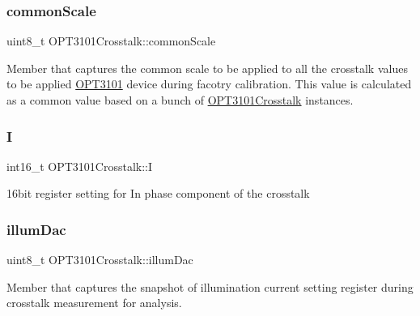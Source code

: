 \subsubsection{\texorpdfstring{common\+Scale}{commonScale}}
{\footnotesize\ttfamily uint8\+\_\+t O\+P\+T3101\+Crosstalk\+::common\+Scale}



Member that captures the common scale to be applied to all the crosstalk values to be applied \mbox{\hyperlink{namespace_o_p_t3101}{O\+P\+T3101}} device during facotry calibration. This value is calculated as a common value based on a bunch of \mbox{\hyperlink{class_o_p_t3101_crosstalk}{O\+P\+T3101\+Crosstalk}} instances. 

\mbox{\label{class_o_p_t3101_crosstalk_a382c8271e35b33821b22d612466c96c7}} 
\subsubsection{\texorpdfstring{I}{I}}
{\footnotesize\ttfamily int16\+\_\+t O\+P\+T3101\+Crosstalk\+::I}



16bit register setting for In phase component of the crosstalk 

\mbox{\label{class_o_p_t3101_crosstalk_a2f1b619763f8f5ea6d15a478b8eae4fa}} 
\subsubsection{\texorpdfstring{illum\+Dac}{illumDac}}
{\footnotesize\ttfamily uint8\+\_\+t O\+P\+T3101\+Crosstalk\+::illum\+Dac}



Member that captures the snapshot of illumination current setting register during crosstalk measurement for analysis. 

\mbox{\label{class_o_p_t3101_crosstalk_ac7f795c6099ada30df153141f08e3961}} 
